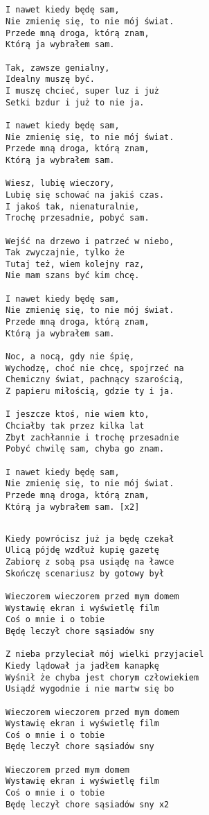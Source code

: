 \documentclass[12pt]{article}
\begin{document}
\subsection*{}
\begin{verbatim}
I nawet kiedy będę sam,
Nie zmienię się, to nie mój świat.
Przede mną droga, którą znam,
Którą ja wybrałem sam.

Tak, zawsze genialny,
Idealny muszę być.
I muszę chcieć, super luz i już
Setki bzdur i już to nie ja.

I nawet kiedy będę sam,
Nie zmienię się, to nie mój świat.
Przede mną droga, którą znam,
Którą ja wybrałem sam.

Wiesz, lubię wieczory,
Lubię się schować na jakiś czas.
I jakoś tak, nienaturalnie,
Trochę przesadnie, pobyć sam.

Wejść na drzewo i patrzeć w niebo,
Tak zwyczajnie, tylko że
Tutaj też, wiem kolejny raz,
Nie mam szans być kim chcę.

I nawet kiedy będę sam,
Nie zmienię się, to nie mój świat.
Przede mną droga, którą znam,
Którą ja wybrałem sam.

Noc, a nocą, gdy nie śpię,
Wychodzę, choć nie chcę, spojrzeć na
Chemiczny świat, pachnący szarością,
Z papieru miłością, gdzie ty i ja.

I jeszcze ktoś, nie wiem kto,
Chciałby tak przez kilka lat
Zbyt zachłannie i trochę przesadnie
Pobyć chwilę sam, chyba go znam.

I nawet kiedy będę sam,
Nie zmienię się, to nie mój świat.
Przede mną droga, którą znam,
Którą ja wybrałem sam. [x2]
\end{verbatim}
\clearpage

\subsection*{}
\begin{verbatim}
Kiedy powrócisz już ja będę czekał
Ulicą pójdę wzdłuż kupię gazetę
Zabiorę z sobą psa usiądę na ławce
Skończę scenariusz by gotowy był

Wieczorem wieczorem przed mym domem
Wystawię ekran i wyświetlę film
Coś o mnie i o tobie
Będę leczył chore sąsiadów sny

Z nieba przyleciał mój wielki przyjaciel
Kiedy lądował ja jadłem kanapkę
Wyśnił że chyba jest chorym człowiekiem
Usiądź wygodnie i nie martw się bo

Wieczorem wieczorem przed mym domem
Wystawię ekran i wyświetlę film
Coś o mnie i o tobie
Będę leczył chore sąsiadów sny

Wieczorem przed mym domem
Wystawię ekran i wyświetlę film
Coś o mnie i o tobie
Będę leczył chore sąsiadów sny x2
\end{verbatim}
\clearpage
\end{document}
